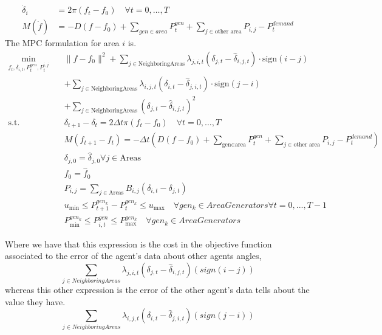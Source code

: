 \documentclass{article}
\begin{document}
\begin{align}
    \dot{\delta}_i &= 2 \pi (f_t - f_0) \quad  \forall t = 0, \dots, T\\
    M(\dot{f}) &= -D(f-f_0) + \sum_{gen \in area} P^{gen}_t +\sum_{j \in \text{other area}}P_{i,j} - P^{demand}_t 
\end{align}
The MPC formulation for area $i$ is.
\begin{align}
    \min_{f_{t}, \delta_{i,t}, P^{gen}_{t}, P^{i,j}_t} \quad 
    & \|f - f_0\|^2 
    + \sum_{j \in \text{NeighboringAreas}} \lambda_{j, i, t} (\delta_{j,t} - \hat{\delta}_{i,j,t}) \cdot \text{sign}(i-j) \\
    & + \sum_{j \in \text{NeighboringAreas}} \lambda_{i,j,t} (\delta_{i,t} - \hat{\delta}_{j,i,t}) \cdot \text{sign}(j-i) \nonumber \\
    & + \sum_{j \in \text{NeighboringAreas}} (\delta_{j,t} - \hat{\delta}_{i,j,t})^2 \nonumber \\
    \text{s.t.} \quad 
    & \delta_{t+1} -\delta_{t} = 2 \Delta t \pi (f_t - f_0) \quad \forall t = 0, \dots, T \\
    & M(f_{t+1} - f_t) = -\Delta t \left(D(f-f_0) + \sum_{\text{gen} \in \text{area}} P^{gen}_t + \sum_{j \in \text{other area}} P_{i,j} - P^{demand}_t \right) \\
    & \delta_{j,0} = \hat{\delta}_{j,0}  \forall j \in \text{Areas}\\
    & f_0 = \hat{f}_0 \\
    & P_{i,j} = \sum_{j \in \text{Areas}} B_{i,j}(\delta_{i,t} - \delta_{j,t}) \\
    & u_{\min} \leq P^{gen_k }_{t+1} - P^{gen_k }_{t} \leq u_{\max} \quad \forall gen_k \in AreaGenerators \forall t = 0,...,T-1\\
    & P^{gen_k}_{\min} \leq P^{gen}_{i, t} \leq P^{gen_k}_{\max} \quad \forall gen_k \in AreaGenerators
\end{align}

Where we have that this expression is the cost in the objective function associated to the error of the agent's data about other agents angles,
\begin{equation}
    \sum_{j \in NeighboringAreas}\lambda_{j, i, t}(\delta_{j,t} - \hat{\delta}_{i,j,t})(sign(i-j))
\end{equation} 
whereas this other expression is the error of the other agent's data tells about the value they have.
\begin{equation}
    \sum_{j \in NeighboringAreas}\lambda_{i,j,t}(\delta_{i,t} - \hat{\delta}_{j,i,t})(sign(j-i))
\end{equation} 
\end{document}
